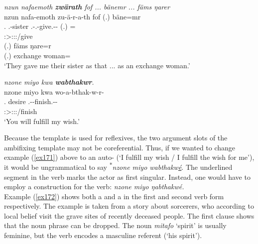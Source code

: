 \begin{exe}
	\ex \emph{nzun nafaemoth \textbf{zwärath} fof ... bänemr ... fäms ŋarer}\\
	\glll nzun nafa-emoth zu-ä-r-a-th fof (.) bäne=mr\\
	\Fsg.\Dat{} \Third.\Poss-sister \Fsg.\Gam-\Vc.\Ndu-give.\Rs-\Pst-\Stnsg{} \Emph{} (.) \Recog=\Purp{}\\
	{} {} \footnotesize{\Stpl:\Sbj>\Fsg:\Io:\Pst:\Pfv/give} {} {} {} {} {}\\
	\sn
	\gll (.) fäms ŋare=r\\
	(.) exchange woman=\Purp\\
	\trans `They gave me their sister as that ... as an exchange woman.'\\
	\label{ex173}
\end{exe}
\begin{exe}
	\ex \emph{nzone miyo kwa \textbf{wabthakwr}.}\\
	\glll nzone miyo kwa wo-a-bthak-w-r-\Zero{}\\
	\Fsg.\Poss{} desire \Fut{} \Fsg.\Alph-\Vc-finish.\Ext-\Lk-\Stsg{}\\
	{} {} {} \footnotesize{\Stsg:\Sbj>\Fsg:\Io:\Nonpast:\Ipfv/finish}\\
	\trans `You will fulfill my wish.'
	\label{ex171}
\end{exe}

Because the  template is used for reflexives, the two argument slots of the ambifixing template may not be coreferential. Thus, if we wanted to change example (\ref{ex171}) above to an auto- (`I fulfill my wish / I fulfill the wish for me'), it would be ungrammatical to say \textsuperscript{$\ast$}\emph{nzone miyo wabthakw\underline{é}}. The underlined segment in the verb marks the actor as first singular. Instead, one would have to employ a  construction for the verb: \emph{nzone miyo ŋabthakwé.}\\

Example (\ref{ex172}) shows both a  and a  in the first and second verb form respectively. The example is taken from a story about sorcerers, who \textendash{} according to local belief \textendash{} visit the grave sites of recently deceased people. The first clause shows that the  noun phrase can be dropped. The noun \emph{mitafo} `spirit' is usually feminine, but the verb encodes a masculine referent (`his spirit').

